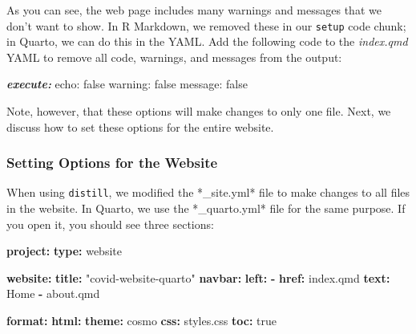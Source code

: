 \documentclass[
]{book}
\newenvironment{Shaded}{\begin{snugshade}}{\end{snugshade}}
\newcommand{\AnnotationTok}[1]{\textcolor[rgb]{0.56,0.35,0.01}{\textbf{\textit{#1}}}}
\newcommand{\AttributeTok}[1]{\textcolor[rgb]{0.13,0.29,0.53}{#1}}
\newcommand{\CharTok}[1]{\textcolor[rgb]{0.31,0.60,0.02}{#1}}
\newcommand{\CommentTok}[1]{\textcolor[rgb]{0.56,0.35,0.01}{\textit{#1}}}
\newcommand{\FunctionTok}[1]{\textcolor[rgb]{0.13,0.29,0.53}{\textbf{#1}}}
\newcommand{\KeywordTok}[1]{\textcolor[rgb]{0.13,0.29,0.53}{\textbf{#1}}}
\newcommand{\NormalTok}[1]{#1}
\newcommand{\StringTok}[1]{\textcolor[rgb]{0.31,0.60,0.02}{#1}}
\begin{document}
As you can see, the web page includes many warnings and messages that we don't want to show. In R Markdown, we removed these in our \texttt{setup} code chunk; in Quarto, we can do this in the YAML. Add the following code to the \emph{index.qmd} YAML to remove all code, warnings, and messages from the output:

\begin{Shaded}
\begin{Highlighting}[]
\AnnotationTok{execute:}\CommentTok{ }
\NormalTok{  echo: false}
\NormalTok{  warning: false}
\NormalTok{  message: false}
\end{Highlighting}
\end{Shaded}

Note, however, that these options will make changes to only one file. Next, we discuss how to set these options for the entire website.

\hypertarget{setting-options-for-the-website}{%
\subsubsection*{Setting Options for the Website}\label{setting-options-for-the-website}}

When using \texttt{distill}, we modified the *\_site.yml* file to make changes to all files in the website. In Quarto, we use the *\_quarto.yml* file for the same purpose. If you open it, you should see three sections:

\begin{Shaded}
\begin{Highlighting}[]
\FunctionTok{project}\KeywordTok{:}
\AttributeTok{  }\FunctionTok{type}\KeywordTok{:}\AttributeTok{ website}

\FunctionTok{website}\KeywordTok{:}
\AttributeTok{  }\FunctionTok{title}\KeywordTok{:}\AttributeTok{ }\StringTok{"covid{-}website{-}quarto"}
\AttributeTok{  }\FunctionTok{navbar}\KeywordTok{:}
\AttributeTok{    }\FunctionTok{left}\KeywordTok{:}
\AttributeTok{      }\KeywordTok{{-}}\AttributeTok{ }\FunctionTok{href}\KeywordTok{:}\AttributeTok{ index.qmd}
\AttributeTok{        }\FunctionTok{text}\KeywordTok{:}\AttributeTok{ Home}
\AttributeTok{      }\KeywordTok{{-}}\AttributeTok{ about.qmd}

\FunctionTok{format}\KeywordTok{:}
\AttributeTok{  }\FunctionTok{html}\KeywordTok{:}
\AttributeTok{    }\FunctionTok{theme}\KeywordTok{:}\AttributeTok{ cosmo}
\AttributeTok{    }\FunctionTok{css}\KeywordTok{:}\AttributeTok{ styles.css}
\AttributeTok{    }\FunctionTok{toc}\KeywordTok{:}\AttributeTok{ }\CharTok{true}
\end{Highlighting}
\end{Shaded}
\end{document}
